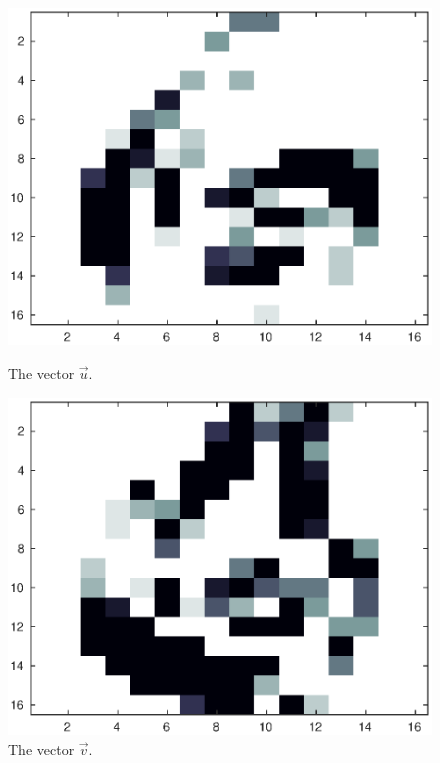 \begin{figure}[H]
    \centering
    \begin{minipage}{.3\textwidth}
        \includegraphics[width = \linewidth]{images/knn/difference66.eps}
        \caption{The vector \(\vec{u}\).}\label{fig:difference66}
    \end{minipage}
    \begin{minipage}{.3\textwidth}
        \includegraphics[width = \linewidth]{images/knn/difference46.eps}
        \caption{The vector \(\vec{v}\).}\label{fig:differenc46}
    \end{minipage}
\end{figure}
